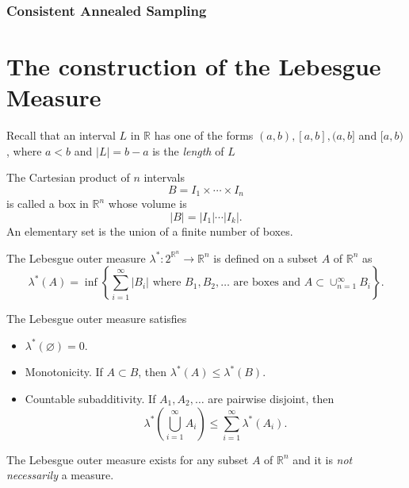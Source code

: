 \subsubsection{Consistent Annealed Sampling}


\section{The construction of the Lebesgue Measure}
Recall that an interval $L$ in $\mathbb{R}$ has one of the forms $(a,b),[a,b],(a,b]$ and $[a,b)$, where $a<b$ and $|L|=b-a$ is the \textit{length} of $L$
\label{appendix:lebmeasure}
\begin{definition}
  The Cartesian product of $n$ intervals
  $$B=I_1\times\cdots\times I_n$$
  is called a box in $\mathbb{R}^n$ whose volume is
  $$|B|=|I_1|\cdots|I_k|.$$
  An elementary set is the union of a finite number of boxes.
\end{definition}

\begin{definition}
  The Lebesgue outer measure $\lambda^*:2^{\mathbb{R}^n}\to\mathbb{R}^n$ is defined on a subset $A$ of $\mathbb{R}^n$ as
  \begin{equation}
    \lambda^*(A)=\inf\left\{\sum\limits_{i=1}^\infty |B_i| \text{ where } B_1,B_2,\ldots \text{ are boxes and } A\subset\cup_{n=1}^\infty B_i\right\}.
  \end{equation}
\end{definition}

\begin{proposition}
  The Lebesgue outer measure satisfies
  \begin{itemize}
    \item $\lambda^*(\varnothing) = 0$.
    \item Monotonicity. If $A\subset B$, then $\lambda^*(A)\le\lambda^*(B)$.
    \item Countable subadditivity. If $A_1,A_2,\ldots$ are pairwise disjoint, then
          $$\lambda^*\left(\bigcup\limits_{i=1}^\infty A_i\right)\le\sum\limits_{i=1}^\infty\lambda^*(A_i).$$
  \end{itemize}
\end{proposition}

\begin{remark}
  The Lebesgue outer measure exists for any subset $A$ of $\mathbb{R}^n$ and it is \textit{not necessarily} a measure.
\end{remark}

